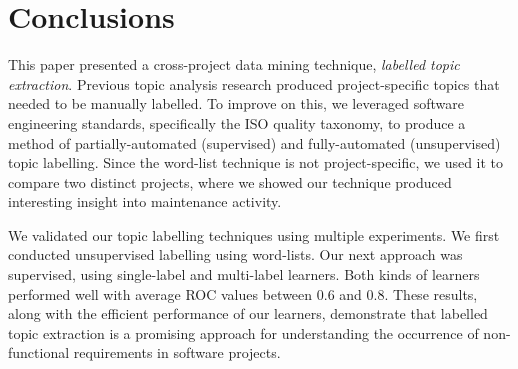 \documentclass[]{sig-alternate}
\begin{document}
\section{Conclusions}
This paper presented a cross-project data mining technique,
\emph{labelled topic extraction}. %
Previous topic analysis research produced project-specific
topics that needed to be manually labelled.
To improve on this, we leveraged software engineering standards, specifically the ISO quality taxonomy, to produce a method of partially-automated (supervised) and fully-automated (unsupervised) topic labelling.
Since the word-list technique is not project-specific, we used it to compare two distinct projects, where we showed our technique produced interesting insight into maintenance activity. %

We validated our topic labelling techniques using multiple experiments. %
We first conducted unsupervised labelling using word-lists. 
Our next approach was supervised, using single-label and multi-label learners. 
Both kinds of learners performed well with average
ROC values between $0.6$ and $0.8$. These results, along with the efficient performance of our learners, demonstrate that labelled topic extraction is a promising approach for understanding the occurrence of non-functional requirements in software projects. 
\end{document}
